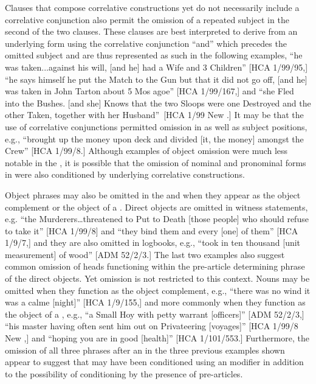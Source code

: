 Clauses that compose correlative constructions yet do not necessarily include a correlative conjunction also permit the omission of a repeated  subject in the second of the two clauses. These clauses are best interpreted to derive from an underlying form using the correlative conjunction “and” which precedes the omitted  subject and are thus represented as such in the following examples, “he was taken...against his will, [and he] had a Wife and 3 Children” [HCA 1/99/95,] “he says himself he put the Match to the Gun but that it did not go off, [and he] was taken in John Tarton about 5 Mos agoe” [HCA 1/99/167,] and “she Fled into the Bushes. [and she] Knows that the two Sloops were one Destroyed and the other Taken, together with her Husband”~[HCA 1/99 New \citealt{Providence1722}.] It may be that the use of correlative conjunctions permitted  omission in  as well as subject positions, e.g., “brought up the money upon deck and divided [it, the money] amongst the Crew” [HCA 1/99/8.] Although examples of object omission were much less notable in the , it is possible that the omission of nominal and pronominal  forms in  were also conditioned by underlying correlative constructions. 

Object  phrases may also be omitted in the  and when they appear as the object complement or the object of a . Direct objects are omitted in witness statements, e.g. “the Murderers…threatened to Put to Death [those people] who should refuse to take it” [HCA 1/99/8] and “they bind them and every [one] of them” [HCA 1/9/7,] and they are also omitted in logbooks, e.g., “took in ten thousand [unit measurement] of wood” [ADM 52/2/3.] The last two examples also suggest common omission of  heads functioning within the pre-article determining phrase of the direct objects. Yet omission is not restricted to this context. Nouns may be omitted when they function as the object complement, e.g., “there was no wind it was a calme [night]” [HCA 1/9/155,] and more commonly when they function as the object of a , e.g., “a Small Hoy with petty warrant [officers]” [ADM 52/2/3,] “his master having often sent him out on Privateering [voyages]” [HCA 1/99/8 New \citealt{Providence1722},] and “hoping you are in good [health]” [HCA 1/101/553.] Furthermore, the omission of all three  phrases after an  in the three previous examples shown appear to suggest that  may have been conditioned using an  modifier in addition to the possibility of conditioning by the presence of pre-articles. 


